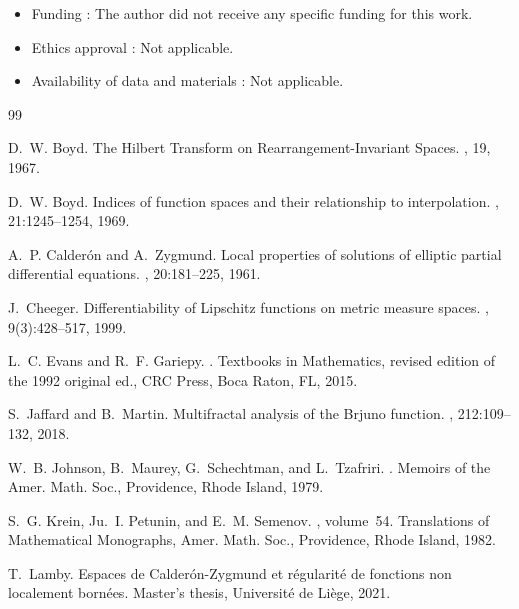 \documentclass[a4paper,10pt]{article}
\theoremstyle{thmstyleone}%
\theoremstyle{thmstyletwo}%
\theoremstyle{thmstylethree}%
\begin{document}
\begin{itemize}
\item Funding : The author did not receive any specific funding for this work.
\item Ethics approval : Not applicable.
\item Availability of data and materials : Not applicable.
\end{itemize}





\begin{thebibliography}{99}

D.~W. Boyd.
\newblock The {H}ilbert {T}ransform on {R}earrangement-{I}nvariant {S}paces.
, 19, 1967.

D.~W. Boyd.
\newblock Indices of function spaces and their relationship to interpolation.
, 21:1245--1254, 1969.

A.~P. Calder{\'o}n and A.~Zygmund.
\newblock Local properties of solutions of elliptic partial differential equations.
, 20:181--225, 1961.

J.~Cheeger.
\newblock Differentiability of {L}ipschitz functions on metric measure spaces.
, 9(3):428--517, 1999.

L.~C. Evans and R.~F. Gariepy.
.
\newblock Textbooks in Mathematics, revised edition of the 1992 original ed., CRC Press, Boca Raton, FL, 2015.

S.~Jaffard and B.~Martin.
\newblock Multifractal analysis of the {B}rjuno function.
, 212:109--132, 2018.

W.~B. Johnson, B.~Maurey, G.~Schechtman, and L.~Tzafriri.
.
\newblock Memoirs of the Amer. Math. Soc., Providence, Rhode Island, 1979.

S.~G. Krein, Ju.~I. Petunin, and E.~M. Semenov.
, volume~54.
\newblock Translations of Mathematical Monographs, Amer. Math. Soc., Providence, Rhode Island, 1982.

T.~Lamby.
\newblock Espaces de {C}alder{\'o}n-{Z}ygmund et r{\'e}gularit{\'e} de fonctions non localement born{\'e}es.
\newblock Master's thesis, Universit{\'e} de Li{\`e}ge, 2021.


\end{thebibliography}
\end{document}
